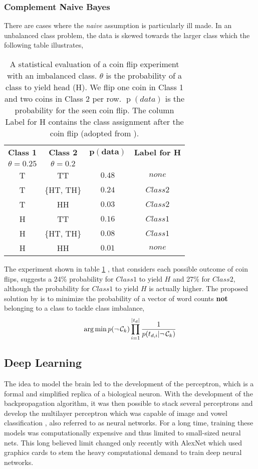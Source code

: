 \subsubsection{Complement Naive Bayes}
  There are cases where the \emph{naive} assumption is particularly ill made. In an unbalanced class problem, the data is skewed towards the larger class which the following table illustrates,

  \begin{table}[h!]
    \centering
    \caption{A statistical evaluation of a coin flip experiment with an imbalanced class. $\theta$ is the probability of a class to yield head (H). We flip one coin in Class 1 and two coins in Class 2 per row. $\operatorname{p}(data)$ is the probability for the seen coin flip. The column Label for H contains the class assignment after the coin flip (adopted from \cite{Rennie2003}).}
    \setlength{\tabcolsep}{1.5em}
    \begin{tabular}{@{}cccc@{}}
      \toprule
      \textbf{Class 1} & \textbf{Class 2} & $\mathbf{p(data)}$ & \textbf{Label for H} \\
      $\theta = 0.25$ & $\theta=0.2$ & & \\
      \midrule
      T & TT & $0.48$ & $none$ \\
      T & \{HT, TH\} & $0.24$ & $Class 2$ \\
      T & HH & $0.03$ & $Class 2$ \\
      H & TT & $0.16$ & $Class 1$ \\
      H & \{HT, TH\} & $0.08$ & $Class 1$ \\
      H & HH & $0.01$ & $none$ \\
      \bottomrule
    \end{tabular}
    \label{table:coinflip}
  \end{table}
  The experiment shown in table \ref{table:coinflip} , that considers each possible outcome of coin flips, suggests a 24\% probability for $Class 1$ to yield $H$ and 27\% for $Class 2$, although the probability for $Class 1$ to yield $H$ is actually higher.
  The proposed solution by \cite{Rennie2003} is to minimize the probability of a vector of word counts \textbf{not} belonging to a class to tackle class imbalance,
  \[\operatorname*{arg\,min} p(\neg\, \mathcal{C}_k) \prod_{i=1}^{|t_{d}|} \frac{1}{p(t_{d,i}|\neg\, \mathcal{C}_k)} \]

\subsection{Deep Learning}
  The idea to model the brain led to the development of the perceptron, which is a formal and simplified replica of a biological neuron.
  With the development of the backpropagation algorithm, it was then possible to stack several perceptrons and develop the multilayer perceptron which was capable of image and vowel classification \citep{Russell2009}, also referred to as neural networks.
  For a long time, training these models was computationally expensive and thus limited to small-sized neural nets.
  This long believed limit changed only recently with AlexNet \citep{Krizhevsky2012} which used graphics cards to stem the heavy computational demand to train deep neural networks.

